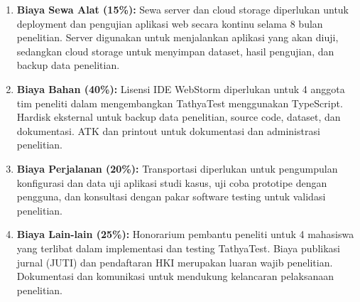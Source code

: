 \begin{enumerate}
    \item \textbf{Biaya Sewa Alat (15\%):} Sewa server dan cloud storage diperlukan untuk deployment dan pengujian aplikasi web secara kontinu selama 8 bulan penelitian. Server digunakan untuk menjalankan aplikasi yang akan diuji, sedangkan cloud storage untuk menyimpan dataset, hasil pengujian, dan backup data penelitian.

    \item \textbf{Biaya Bahan (40\%):} Lisensi IDE WebStorm diperlukan untuk 4 anggota tim peneliti dalam mengembangkan TathyaTest menggunakan TypeScript. Hardisk eksternal untuk backup data penelitian, source code, dataset, dan dokumentasi. ATK dan printout untuk dokumentasi dan administrasi penelitian.

    \item \textbf{Biaya Perjalanan (20\%):} Transportasi diperlukan untuk pengumpulan konfigurasi dan data uji aplikasi studi kasus, uji coba prototipe dengan pengguna, dan konsultasi dengan pakar software testing untuk validasi penelitian.

    \item \textbf{Biaya Lain-lain (25\%):} Honorarium pembantu peneliti untuk 4 mahasiswa yang terlibat dalam implementasi dan testing TathyaTest. Biaya publikasi jurnal (JUTI) dan pendaftaran HKI merupakan luaran wajib penelitian. Dokumentasi dan komunikasi untuk mendukung kelancaran pelaksanaan penelitian.
\end{enumerate}
